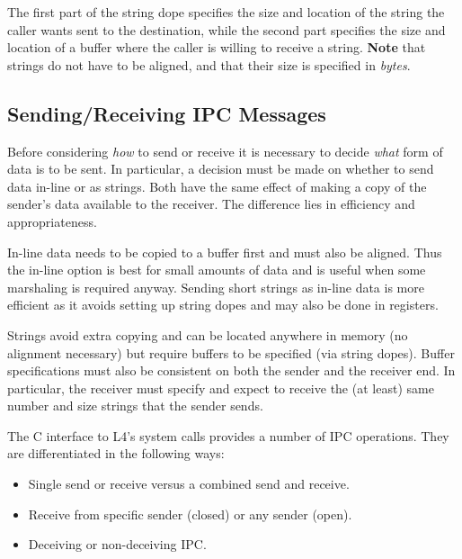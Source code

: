 The first part of the string dope specifies the size and location of
the string the caller wants sent to the destination, while the second
part specifies the size and location of a buffer where the caller is
willing to receive a string. \textbf{Note} that strings do not have to
be aligned, and that their size is specified in \emph{bytes}.



\subsection{Sending/Receiving IPC Messages}


Before considering \emph{how} to send or receive it is necessary to
decide \emph{what} form of data is to be sent. In particular, a
decision must be made on whether to send data in-line or as strings.
Both have the same effect of making a copy of the sender's data
available to the receiver. The difference lies in efficiency and
appropriateness.

In-line data needs to be copied to a buffer first and must also be
aligned. Thus the in-line option is best for small amounts of data and
is useful when some marshaling is required anyway. Sending short
strings as in-line data is more efficient as it avoids setting up
string dopes and may also be done in registers.

Strings avoid extra copying and can be located anywhere in memory (no
alignment necessary) but require buffers to be specified (via string
dopes). Buffer specifications must also be consistent on both the
sender and the receiver end. In particular, the receiver must specify
and expect to receive the (at least) same number and size strings that
the sender sends.

The C interface to L4's system calls provides a number of IPC
operations. They are differentiated in the following ways:

\begin{itemize}

\item Single send or receive versus a combined send and receive.
        
\item Receive from specific sender (closed) or any sender (open).

\item Deceiving or non-deceiving IPC.

\end{itemize} 

